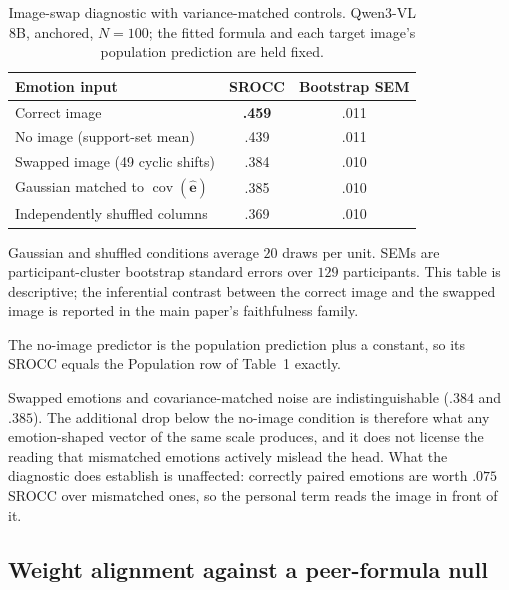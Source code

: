 \begin{table}[t]
\centering
\begin{threeparttable}
\caption{Image-swap diagnostic with variance-matched controls. Qwen3-VL 8B,
anchored, $N=100$; the fitted formula and each target image's population
prediction are held fixed.}
\label{tab:swap_controls}
\small
\setlength{\tabcolsep}{5pt}
\begin{tabular}{lcc}
\toprule
Emotion input & SROCC & Bootstrap SEM \\
\midrule
Correct image                       & \textbf{.459} & .011 \\
No image (support-set mean)         & .439 & .011 \\
Swapped image (49 cyclic shifts)    & .384 & .010 \\
Gaussian matched to $\operatorname{cov}(\hat{\mathbf e})$ & .385 & .010 \\
Independently shuffled columns      & .369 & .010 \\
\bottomrule
\end{tabular}
\begin{tablenotes}[flushleft]\footnotesize
\item Gaussian and shuffled conditions average $20$ draws per unit. SEMs are
participant-cluster bootstrap standard errors over $129$ participants. This
table is descriptive; the inferential contrast between the correct image and
the swapped image is reported in the main paper's faithfulness family.
\item The no-image predictor is the population prediction plus a constant, so
its SROCC equals the Population row of Table~1 exactly.
\end{tablenotes}
\end{threeparttable}
\end{table}

Swapped emotions and covariance-matched noise are indistinguishable
($.384$ and $.385$). The additional drop below the no-image condition is
therefore what any emotion-shaped vector of the same scale produces, and it
does not license the reading that mismatched emotions actively mislead the
head. What the diagnostic does establish is unaffected: correctly paired
emotions are worth $.075$ SROCC over mismatched ones, so the personal term
reads the image in front of it.

\subsection{Weight alignment against a peer-formula null}

